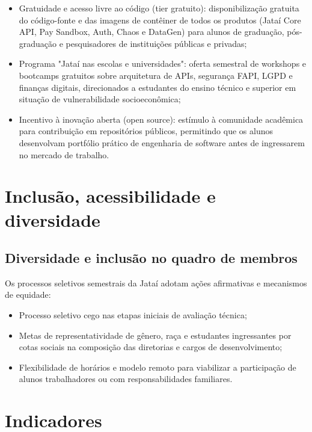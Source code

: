 \documentclass[
  12pt,
  openright,
  oneside,
  a4paper,
  brazilian
]{abntex2}
\begin{document}
\begin{itemize}
    \item{Gratuidade e acesso livre ao código (tier gratuito):} disponibilização gratuita do código-fonte e das imagens de contêiner de todos os produtos (Jataí Core API, Pay Sandbox, Auth, Chaos e DataGen) para alunos de graduação, pós-graduação e pesquisadores de instituições públicas e privadas;
    \item{Programa "Jataí nas escolas e universidades":} oferta semestral de workshops e bootcamps gratuitos sobre arquitetura de APIs, segurança FAPI, LGPD e finanças digitais, direcionados a estudantes do ensino técnico e superior em situação de vulnerabilidade socioeconômica;
    \item{Incentivo à inovação aberta (open source):} estímulo à comunidade acadêmica para contribuição em repositórios públicos, permitindo que os alunos desenvolvam portfólio prático de engenharia de software antes de ingressarem no mercado de trabalho.
\end{itemize}

\section{Inclusão, acessibilidade e diversidade}
\label{sec:inclusao_acessibilidade}

\subsection{Diversidade e inclusão no quadro de membros}
Os processos seletivos semestrais da Jataí adotam ações afirmativas e mecanismos de equidade:
\begin{itemize}
    \item Processo seletivo cego nas etapas iniciais de avaliação técnica;
    \item Metas de representatividade de gênero, raça e estudantes ingressantes por cotas sociais na composição das diretorias e cargos de desenvolvimento;
    \item Flexibilidade de horários e modelo remoto para viabilizar a participação de alunos trabalhadores ou com responsabilidades familiares.
\end{itemize}

\section{Indicadores}
\label{sec:impacto_social}
\end{document}

